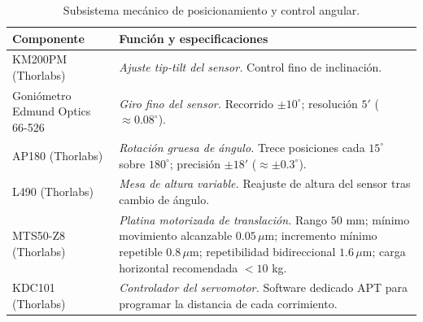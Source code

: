 \documentclass[letterpaper,12pt,oneside]{book}
\begin{document}
\begin{table}[htbp]
\centering
\caption{Subsistema mecánico de posicionamiento y control angular.}
\label{tab:ap-mecanico}
\small
\begin{tabular}{@{}l p{}@{}}
\hline
\textbf{Componente} & \textbf{Función y especificaciones} \\
\hline
KM200PM (Thorlabs) & \textit{Ajuste tip-tilt del sensor.} Control fino de inclinación. \\
Goniómetro Edmund Optics 66-526 & \textit{Giro fino del sensor.} Recorrido $\pm 10^\circ$; resolución $5'$ ($\approx 0.08^\circ$). \\
AP180 (Thorlabs) & \textit{Rotación gruesa de ángulo.} Trece posiciones cada $15^\circ$ sobre $180^\circ$; precisión $\pm 18'$ ($\approx \pm 0.3^\circ$). \\
L490 (Thorlabs) & \textit{Mesa de altura variable.} Reajuste de altura del sensor tras cambio de ángulo. \\
MTS50-Z8 (Thorlabs) & \textit{Platina motorizada de translación.} Rango $50$ mm; mínimo movimiento alcanzable $0.05\,\mu$m; incremento mínimo repetible $0.8\,\mu$m; repetibilidad bidireccional $1.6\,\mu$m; carga horizontal recomendada $<10$ kg. \\
KDC101 (Thorlabs) & \textit{Controlador del servomotor.} Software dedicado APT para programar la distancia de cada corrimiento. \\
\hline
\end{tabular}
\end{table}
\end{document}
